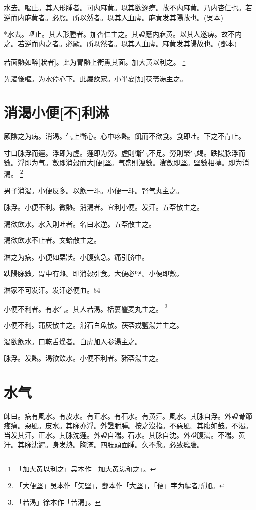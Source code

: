 \documentclass[12pt,twoside,UTF8,b5paper]{ctexbook}
\begin{document}
水去。嘔止。其人形腫者。可内麻黄。以其欲逐痹。故不内麻黄。乃内杏仁也。若逆而内麻黄者。必厥。所以然者。以其人血虗。麻黄发其陽故也。(吳本)

*水去。嘔止。其人形腫者。加杏仁主之。其證應内麻黄。以其人遂痹。故不内之。若逆而内之者。必厥。所以然者。以其人血虗。麻黄发其陽故也。(鄧本)

若面熱如醉[狀者]。此为胃熱上衝熏其面。加大黄以利之。
	\footnote{「加大黄以利之」吴本作「加大黄湯和之」。}

先渴後嘔。为水停心下。此屬飲家。小半夏[加]茯苓湯主之。

\chapter{消渴小便[不]利淋}

厥陰之为病。消渴。气上衝心。心中疼熱。飢而不欲食。食即吐。下之不肯止。

寸口脉浮而遲。浮即为虗。遲即为勞。虗則衛气不足。勞則榮气竭。跌陽脉浮而數。浮即为气。數即消穀而大[便]堅。气盛則溲數。溲數即堅。堅數相摶。即为消渴。
	\footnote{「大便堅」吳本作「矢堅」，鄧本作「大堅」，「便」字为編者所加。}

男子消渴。小便反多。以飲一斗。小便一斗。腎气丸主之。

脉浮。小便不利。微熱。消渴者。宜利小便。发汗。五苓散主之。

渴欲飲水。水入則吐者。名曰水逆。五苓散主之。

渴欲飲水不止者。文蛤散主之。

淋之为病。小便如粟狀。小腹弦急。痛引脐中。

趺陽脉數。胃中有熱。即消穀引食。大便必堅。小便即數。

淋家不可发汗。发汗必便血。84

小便不利者。有水气。其人若渴。栝蔞瞿麦丸主之。
	\footnote{「若渴」徐本作「苦渴」。}

小便不利。蒲灰散主之。滑石白魚散。茯苓戎鹽湯并主之。

渴欲飲水。口乾舌燥者。白虎加人参湯主之。

脉浮。发熱。渴欲飲水。小便不利者。豬苓湯主之。

\chapter{水气}

師曰。病有風水。有皮水。有正水。有石水。有黄汗。風水。其脉自浮。外證骨節疼痛。惡風。皮水。其脉亦浮。外證胕腫。按之沒指。不惡風。其腹如鼓。不渴。当发其汗。正水。其脉沈遲。外證自喘。石水。其脉自沈。外證腹滿。不喘。黄汗。其脉沈遲。身发熱。胸滿。四肢頭面腫。久不愈。必致癰膿。
\end{document}
